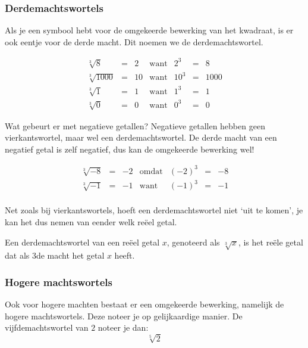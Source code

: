 \subsubsection{Derdemachtswortels}

Als je een symbool hebt voor de omgekeerde bewerking van het kwadraat, is er ook eentje voor de derde macht. Dit noemen we de derdemachtswortel.

\begin{equation*}
\begin{array}{ccccccc}
\sqrt[3]{8} &=& 2 & \text{want} & 2^3 &=& 8 \\
\sqrt[3]{1000} &=& 10 & \text{want} & 10^3 &=& 1000 \\
\sqrt[3]{1} &=& 1 & \text{want} & 1^3 &=& 1 \\
\sqrt[3]{0} &=& 0 & \text{want} & 0^3 &=& 0 
\end{array}
\end{equation*}


Wat gebeurt er met negatieve getallen? Negatieve getallen hebben geen vierkantswortel, maar wel een derdemachtswortel. 
De derde macht van een negatief getal is zelf negatief, dus kan de omgekeerde bewerking wel!

\begin{equation*}
\begin{array}{ccccccc}
\sqrt[3]{-8} &=& -2 & \text{omdat} & (-2)^3 &=& -8 \\
\sqrt[3]{-1} &=& -1 & \text{want} & (-1)^3 &=& -1 \\
\end{array}
\end{equation*}

Net zoals bij vierkantswortels, hoeft een derdemachtswortel niet \textquoteleft uit te komen\textquoteright, je kan het dus nemen van eender welk re\"eel getal.

\begin{definitie}
	Een derdemachtswortel van een re\"eel getal $x$, genoteerd als $\sqrt[3]{x}$, is het re\"ele getal dat als 3de macht het getal $x$ heeft.
\end{definitie}


\subsubsection{Hogere machtswortels}


Ook voor hogere machten bestaat er een omgekeerde bewerking, namelijk de hogere machtswortels. Deze noteer je op gelijkaardige manier. 
De vijfdemachtswortel van $2$ noteer je dan:
\begin{equation*}
\sqrt[5]{2}
\end{equation*}

